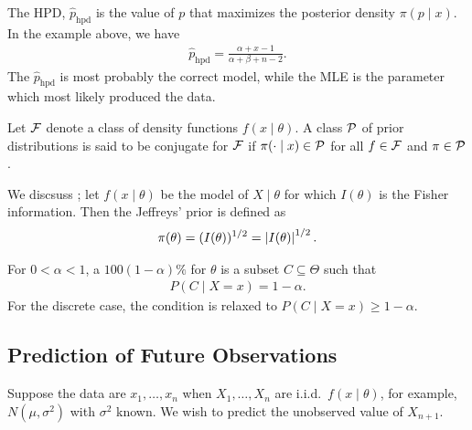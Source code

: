 The HPD,  $\hat{p}_{\text{hpd}}$ is the value of $p$ that maximizes the posterior density $\pi(p \mid x)$. In the example above, we have
\begin{align}
    \hat{p}_{\text{hpd}} = \frac{\alpha + x - 1}{\alpha + \beta + n - 2}.
\end{align}
The $\hat{p}_{\text{hpd}}$ is most probably the correct model, while the MLE is the parameter which most likely produced the data.


\begin{definition}
    Let $\mathcal{F}$ denote a class of density functions $f(x \mid \theta)$. A class $\mathcal{P}$ of prior distributions is said to be conjugate for $\mathcal{F}$ if $\pi( \cdot \mid x) \in \mathcal{P}$ for all $f \in \mathcal{F}$ and $\pi \in \mathcal{P}$.
\end{definition}

We discsuss ; let $f(x \mid \theta)$ be the model of $X \mid \theta$ for which $I(\theta)$ is the Fisher information. Then the Jeffreys' prior is defined as
\begin{align}
    \pi(\theta) = (I(\theta))^{1/2} = \left| I(\theta) \right|^{1/2}.
\end{align}

\begin{definition}
    For $0 < \alpha < 1$, a $100(1-\alpha)\%$  for $\theta$ is a subset $C \subseteq \Theta$ such that
    \begin{align}
        P(C \mid X = x) = 1-\alpha.
    \end{align}
    For the discrete case, the condition is relaxed to $P(C \mid X = x) \geq 1-\alpha$.
\end{definition}


\subsection{Prediction of Future Observations}

Suppose the data are $x_{1},\ldots,x_{n}$ when $X_{1},\ldots,X_{n}$ are i.i.d.~$f(x \mid \theta)$, for example, $N(\mu,\sigma^{2})$ with $\sigma^{2}$ known. We wish to predict the unobserved value of $X_{n+1}$.

